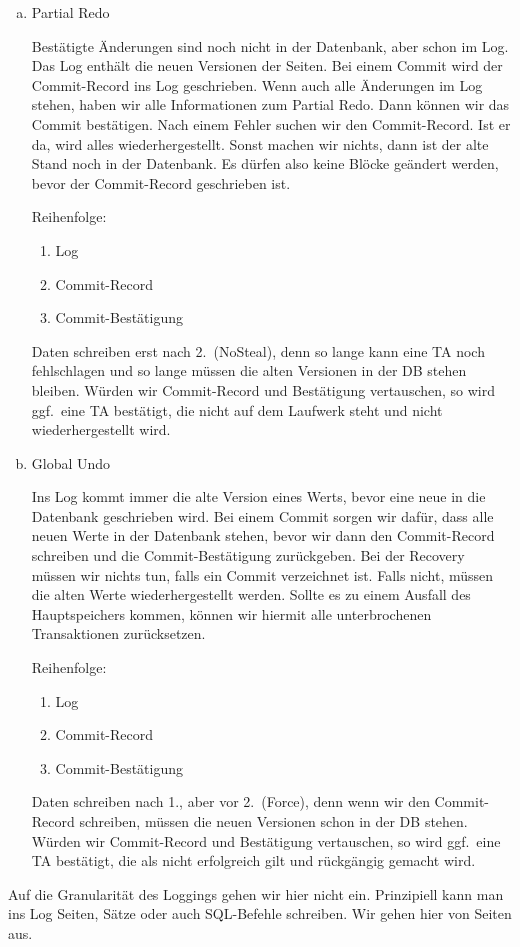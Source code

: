 \begin{solution}
\begin{enumerate}[a)]
\item Partial Redo

Bestätigte Änderungen sind noch nicht in der Datenbank, aber schon im Log. Das Log enthält die neuen Versionen der Seiten. Bei einem Commit wird der Commit-Record ins Log geschrieben. Wenn auch alle Änderungen im Log stehen, haben wir alle Informationen zum Partial Redo. Dann können wir das Commit bestätigen. Nach einem Fehler suchen wir den Commit-Record. Ist er da, wird alles wiederhergestellt. Sonst machen wir nichts, dann ist der alte Stand noch in der Datenbank. Es dürfen also keine Blöcke geändert werden, bevor der Commit-Record geschrieben ist.

Reihenfolge:
\begin{enumerate}[1.]
	\item Log
	\item Commit-Record
	\item Commit-Bestätigung
\end{enumerate}

Daten schreiben erst nach 2.\ (NoSteal), denn so lange kann eine TA noch fehlschlagen und so lange müssen die alten Versionen in der DB stehen bleiben. Würden wir Commit-Record und Bestätigung vertauschen, so wird ggf.\ eine TA bestätigt, die nicht auf dem Laufwerk steht und nicht wiederhergestellt wird.

\item Global Undo

Ins Log kommt immer die alte Version eines Werts, bevor eine neue in die Datenbank geschrieben wird. Bei einem Commit sorgen wir dafür, dass alle neuen Werte in der Datenbank stehen, bevor wir dann den Commit-Record schreiben und die Commit-Bestätigung zurückgeben. Bei der Recovery müssen wir nichts tun, falls ein Commit verzeichnet ist. Falls nicht, müssen die alten Werte wiederhergestellt werden.
Sollte es zu einem Ausfall des Hauptspeichers kommen, können wir hiermit alle unterbrochenen Transaktionen zurücksetzen.

Reihenfolge:
\begin{enumerate}[1.]
	\item Log
	\item Commit-Record
	\item Commit-Bestätigung
\end{enumerate}

Daten schreiben nach 1., aber vor 2.\ (Force), denn wenn wir den Commit-Record schreiben, müssen die neuen Versionen schon in der DB stehen. Würden wir Commit-Record und Bestätigung vertauschen, so wird ggf.\ eine TA bestätigt, die als nicht erfolgreich gilt und rückgängig gemacht wird.
\end{enumerate}

\end{solution}

\begin{note}
Auf die Granularität des Loggings gehen wir hier nicht ein. Prinzipiell kann man ins Log Seiten, Sätze oder auch SQL-Befehle schreiben. Wir gehen hier von Seiten aus.
\end{note}
